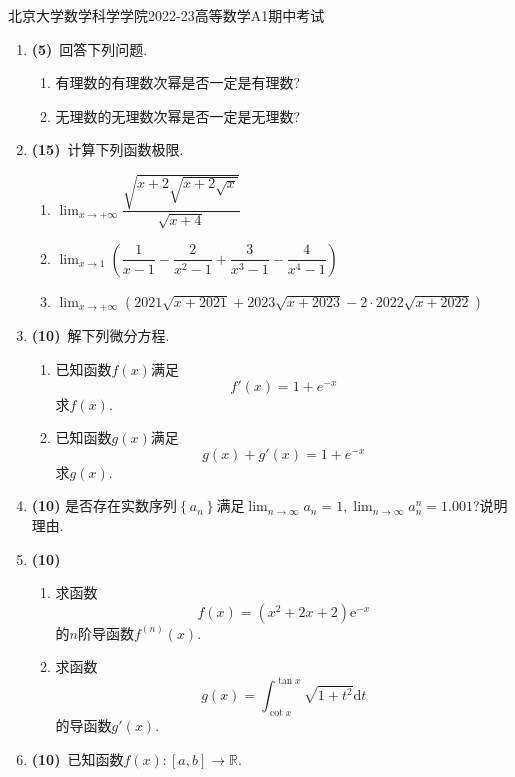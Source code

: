\documentclass{ctexart}
\newcommand{\e}{\mathrm{e}}
\newcommand{\di}{\mathrm{d}}
\newcommand{\R}{\mathbb{R}}
\begin{document}
\pagestyle{empty}
\begin{center}\Large
    北京大学数学科学学院2022-23高等数学A1期中考试
\end{center}
\begin{enumerate}[leftmargin=*,label=\textbf{\arabic*.}]
    \item \textbf{(5)}\ 回答下列问题.
        \begin{enumerate}[label=\textbf{(\arabic*)}]
            \item 有理数的有理数次幂是否一定是有理数?
            \item 无理数的无理数次幂是否一定是无理数?
        \end{enumerate}
    \item \textbf{(15)}\ 计算下列函数极限.
        \begin{enumerate}[label=\textbf{(\arabic*)}]
            \item $\displaystyle\lim_{x\to+\infty}\dfrac{\sqrt{x+2\sqrt{x+2\sqrt{x}}}}{\sqrt{x+4}}$
            \item $\displaystyle\lim_{x\to1}(\dfrac{1}{x-1}-\dfrac{2}{x^2-1}+\dfrac{3}{x^3-1}-\dfrac{4}{x^4-1})$
            \item $\displaystyle\lim_{x\to+\infty}(2021\sqrt{x+2021}+2023\sqrt{x+2023}-2\cdot2022\sqrt{x+2022})$
        \end{enumerate}
    \item \textbf{(10)}\ 解下列微分方程.
        \begin{enumerate}[label=\textbf{(\arabic*)}]
            \item 已知函数$f(x)$满足$$f'(x)=1+e^{-x}$$求$f(x)$.
            \item 已知函数$g(x)$满足$$g(x)+g'(x)=1+e^{-x}$$求$g(x)$.
        \end{enumerate}
    \item \textbf{(10)}
        是否存在实数序列$\left\{a_n\right\}$满足$\displaystyle\lim_{n\to\infty}a_n=1,\lim_{n\to\infty}a_n^n=1.001$?说明理由.
    \item \textbf{(10)}
        \begin{enumerate}[label=\textbf{(\arabic*)}]
            \item 求函数$$f(x)=(x^2+2x+2)\e^{-x}$$的$n$阶导函数$f^{(n)}(x)$.
            \item 求函数$$g(x)=\int_{\cot x}^{\tan x}\sqrt{1+t^2}\di t$$的导函数$g'(x)$.
        \end{enumerate}
    \item \textbf{(10)}\ 已知函数$f(x):[a,b]\to\R$.

\end{enumerate}
\end{document}
